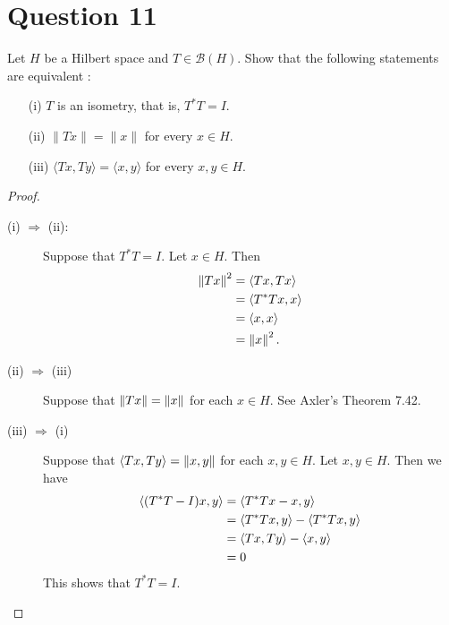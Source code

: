 \section{Question 11}

\horz

Let $H$ be a Hilbert space and $T\in \mathcal B(H).$ Show that the following statements are equivalent :
\begin{itemize}
\item[(i)] $T$ is an isometry, that is, $T^*T= I.$
\item[(ii)] $\|Tx\|= \|x\|$ for every $x\in H.$
\item[(iii)] $\langle Tx,Ty\rangle = \langle x,y \rangle$ for every $x,y\in H.$
\end{itemize}

\horz

\begin{proof}
    \begin{description}
	\item[(i) $\Longrightarrow $ (ii):] Suppose that $T^{*}T=I$. Let $x\in H$. Then 
	    \begin{align*}
		\left\lVert Tx \right\rVert^{2} &= \left\langle Tx, Tx \right\rangle \\
		&= \left\langle T^{*}Tx, x \right\rangle \\
		&= \left\langle x,x \right\rangle \\
		&= \left\lVert x \right\rVert^{2}.
	    \end{align*}
	\item[(ii) $\Longrightarrow$ (iii)] Suppose that $\left\lVert Tx \right\rVert=\left\lVert x \right\rVert$ for each $x\in H$.
	    See Axler's Theorem 7.42.
    \item[(iii) $\Longrightarrow$ (i)] Suppose that $\left\langle Tx, Ty \right\rangle=\left\lVert x,y \right\rVert$ for each $x,y\in H$. Let $x,y\in H$. Then we have
	\begin{align*}
	    \left\langle (T^{*}T-I)x,y \right\rangle &= \left\langle T^{*}Tx-x,y \right\rangle \\
	&= \left\langle T^{*}Tx,y \right\rangle - \left\langle T^{*}Tx,y \right\rangle \\ 
	&= \left\langle Tx, Ty \right\rangle - \left\langle x,y \right\rangle \\
	&= 0
	\end{align*}
	This shows that $T^{*}T=I$.
\end{description}
\end{proof}
